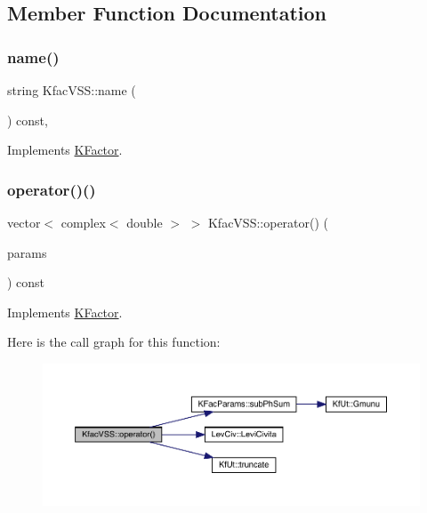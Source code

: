\subsection{Member Function Documentation}
\mbox{\label{classKfacVSS_a12bff0a61d6252df4e362d35c907a877}} 
\subsubsection{\texorpdfstring{name()}{name()}}
{\footnotesize\ttfamily string Kfac\+V\+S\+S\+::name (\begin{DoxyParamCaption}{ }\end{DoxyParamCaption}) const\hspace{0.3cm}{\ttfamily [inline]}, {\ttfamily [virtual]}}



Implements \mbox{\hyperlink{classKFactor_ae578f8d6e4b525895427717da99cab6c}{K\+Factor}}.

\mbox{\label{classKfacVSS_a608b90a0b3fcdd1126e63c4ef68ce3e1}} 
\subsubsection{\texorpdfstring{operator()()}{operator()()}}
{\footnotesize\ttfamily vector$<$ complex$<$ double $>$ $>$ Kfac\+V\+S\+S\+::operator() (\begin{DoxyParamCaption}\item[{const \mbox{\hyperlink{classKFacParams}{K\+Fac\+Params}} \&}]{params }\end{DoxyParamCaption}) const\hspace{0.3cm}{\ttfamily [virtual]}}



Implements \mbox{\hyperlink{classKFactor_a012aae9ff4a07eab86d5d50b7f774285}{K\+Factor}}.

Here is the call graph for this function\+:
\nopagebreak
\begin{figure}[H]
\begin{center}
\leavevmode
\includegraphics[width=350pt]{d9/da4/classKfacVSS_a608b90a0b3fcdd1126e63c4ef68ce3e1_cgraph}
\end{center}
\end{figure}


